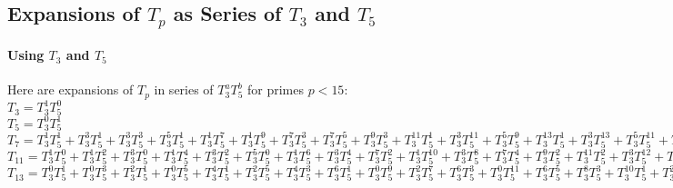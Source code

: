\subsection{Expansions of $T_p$ as Series of $T_3$ and $T_5$}
\paragraph{Using $T_3$ and $T_5$}
\label{expansionsOfTp}
Here are expansions of $T_p$ in series of $T_3^aT_5^b$ for primes $p<15$:\\
$T_{3} = T_3^{1}T_5^{0}$\\
$T_{5} = T_3^{0}T_5^{1}$\\
$T_{7} = T_3^{1}T_5^{1} + T_3^{3}T_5^{1} + T_3^{3}T_5^{3} + T_3^{5}T_5^{1} + T_3^{1}T_5^{7} + T_3^{1}T_5^{9} + T_3^{7}T_5^{3} + T_3^{7}T_5^{5} + T_3^{9}T_5^{3} + T_3^{11}T_5^{1} + T_3^{3}T_5^{11} + T_3^{5}T_5^{9} + T_3^{13}T_5^{1} + T_3^{3}T_5^{13} + T_3^{5}T_5^{11} + T_3^{9}T_5^{7} + T_3^{11}T_5^{5} + T_3^{13}T_5^{3} + T_3^{3}T_5^{15} + T_3^{7}T_5^{11} + T_3^{9}T_5^{9} + T_3^{13}T_5^{5} + T_3^{15}T_5^{3} + \dots $\\   
$T_{11} = T_3^{1}T_5^{0} + T_3^{1}T_5^{2} + T_3^{3}T_5^{0} + T_3^{1}T_5^{4} + T_3^{3}T_5^{2} + T_3^{5}T_5^{0} + T_3^{1}T_5^{6} + T_3^{3}T_5^{4} + T_3^{7}T_5^{2} + T_3^{1}T_5^{10} + T_3^{3}T_5^{8} + T_3^{7}T_5^{4} + T_3^{9}T_5^{2} + T_3^{11}T_5^{2} + T_3^{3}T_5^{12} + T_3^{5}T_5^{10} + T_3^{7}T_5^{8} + T_3^{11}T_5^{4} + T_3^{13}T_5^{2} + T_3^{9}T_5^{8} + T_3^{17}T_5^{0} + \dots $\\
$T_{13} = T_3^{0}T_5^{1} + T_3^{0}T_5^{3} + T_3^{2}T_5^{1} + T_3^{0}T_5^{5} + T_3^{4}T_5^{1} + T_3^{2}T_5^{5} + T_3^{4}T_5^{3} + T_3^{6}T_5^{1} + T_3^{0}T_5^{9} + T_3^{2}T_5^{7} + T_3^{6}T_5^{3} + T_3^{0}T_5^{11} + T_3^{6}T_5^{5} + T_3^{8}T_5^{3} + T_3^{10}T_5^{1} + T_3^{2}T_5^{11} + T_3^{4}T_5^{9} + T_3^{6}T_5^{7} + T_3^{10}T_5^{3} + T_3^{2}T_5^{13} + T_3^{4}T_5^{11} + T_3^{14}T_5^{1} + T_3^{2}T_5^{15} + T_3^{4}T_5^{13} + T_3^{6}T_5^{11} + T_3^{12}T_5^{5} + T_3^{16}T_5^{1} + \dots $\\

